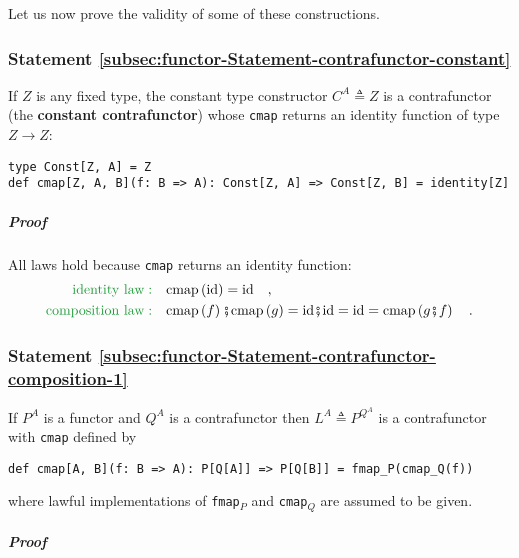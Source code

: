 Let us now prove the validity of some of these constructions.

\subsubsection{Statement \label{subsec:functor-Statement-contrafunctor-constant}\ref{subsec:functor-Statement-contrafunctor-constant}}

If $Z$ is any fixed type, the constant type constructor $C^{A}\triangleq Z$
is a contrafunctor (the \textbf{constant contrafunctor})
whose \lstinline!cmap! returns an identity function of type $Z\rightarrow Z$:
\begin{lstlisting}
type Const[Z, A] = Z
def cmap[Z, A, B](f: B => A): Const[Z, A] => Const[Z, B] = identity[Z] 
\end{lstlisting}


\subparagraph{Proof}

All laws hold because \lstinline!cmap! returns an identity function:
\begin{align*}
{\color{greenunder}\text{identity law}:}\quad & \text{cmap}\left(\text{id}\right)=\text{id}\quad,\\
{\color{greenunder}\text{composition law}:}\quad & \text{cmap}\left(f\right)\bef\text{cmap}\left(g\right)=\text{id}\bef\text{id}=\text{id}=\text{cmap}\left(g\bef f\right)\quad.
\end{align*}


\subsubsection{Statement \label{subsec:functor-Statement-contrafunctor-composition-1}\ref{subsec:functor-Statement-contrafunctor-composition-1}}

If $P^{A}$ is a functor and $Q^{A}$ is a contrafunctor then $L^{A}\triangleq P^{Q^{A}}$
is a contrafunctor with \lstinline!cmap! defined by
\begin{lstlisting}
def cmap[A, B](f: B => A): P[Q[A]] => P[Q[B]] = fmap_P(cmap_Q(f))
\end{lstlisting}
where lawful implementations of \lstinline!fmap!$_{P}$ and \lstinline!cmap!$_{Q}$
are assumed to be given.

\subparagraph{Proof}

